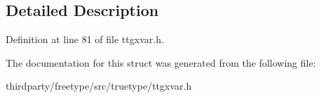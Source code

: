 \subsection{Detailed Description}


Definition at line 81 of file ttgxvar.\+h.



The documentation for this struct was generated from the following file\+:\begin{DoxyCompactItemize}
\item 
thirdparty/freetype/src/truetype/ttgxvar.\+h\end{DoxyCompactItemize}
